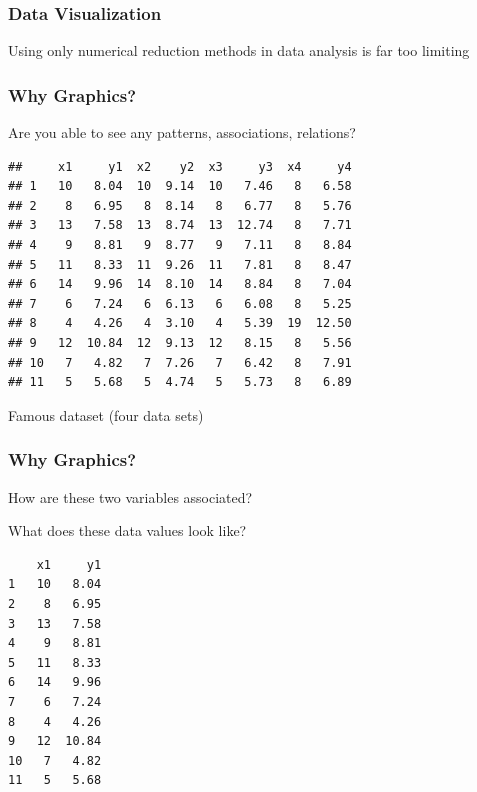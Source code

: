 \documentclass[12pt]{beamer}\usepackage[]{graphicx}\usepackage[]{color}
\makeatletter
\newenvironment{kframe}{%
 \def\at@end@of@kframe{}%
 \ifinner\ifhmode%
  \def\at@end@of@kframe{\end{minipage}}%
  \begin{minipage}{\columnwidth}%
 \fi\fi%
 \def\FrameCommand##1{\hskip\@totalleftmargin \hskip-\fboxsep
 \colorbox{shadecolor}{##1}\hskip-\fboxsep
     \hskip-\linewidth \hskip-\@totalleftmargin \hskip\columnwidth}%
 \MakeFramed {\advance\hsize-\width
   \@totalleftmargin\z@ \linewidth\hsize
   \@setminipage}}%
 {\par\unskip\endMakeFramed%
 \at@end@of@kframe}
\newenvironment{knitrout}{}{} %
\makeatother
\begin{document}
\begin{frame}
\frametitle{Data Visualization}

{\Large Using only numerical reduction methods in data analysis is far too limiting}

\end{frame}


\begin{frame}[fragile]
\frametitle{Why Graphics?}

Are you able to see any patterns, associations, relations?
\begin{knitrout}\scriptsize
{}\color{fgcolor}\begin{kframe}
\begin{verbatim}
##     x1     y1  x2    y2  x3     y3  x4     y4
## 1   10   8.04  10  9.14  10   7.46   8   6.58
## 2    8   6.95   8  8.14   8   6.77   8   5.76
## 3   13   7.58  13  8.74  13  12.74   8   7.71
## 4    9   8.81   9  8.77   9   7.11   8   8.84
## 5   11   8.33  11  9.26  11   7.81   8   8.47
## 6   14   9.96  14  8.10  14   8.84   8   7.04
## 7    6   7.24   6  6.13   6   6.08   8   5.25
## 8    4   4.26   4  3.10   4   5.39  19  12.50
## 9   12  10.84  12  9.13  12   8.15   8   5.56
## 10   7   4.82   7  7.26   7   6.42   8   7.91
## 11   5   5.68   5  4.74   5   5.73   8   6.89
\end{verbatim}
\end{kframe}
\end{knitrout}

{\small Famous dataset  (four data sets)}
\end{frame}


\begin{frame}[fragile]
\frametitle{Why Graphics?}

How are these two variables associated?

\bigskip
What does these data values look like?
\begin{knitrout}\scriptsize
{}\color{fgcolor}\begin{kframe}
\begin{verbatim}
    x1     y1
1   10   8.04
2    8   6.95
3   13   7.58
4    9   8.81
5   11   8.33
6   14   9.96
7    6   7.24
8    4   4.26
9   12  10.84
10   7   4.82
11   5   5.68
\end{verbatim}
\end{kframe}
\end{knitrout}

\end{frame}
\end{document}
